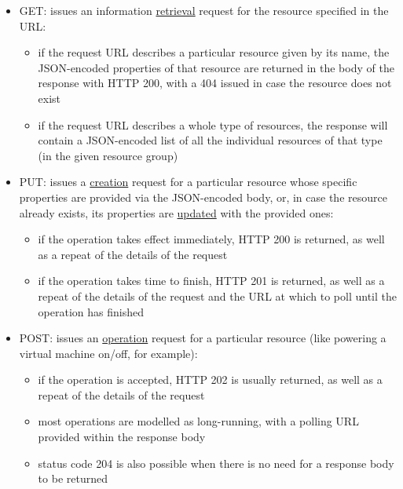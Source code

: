 \documentclass[11pt]{report}
\begin{document}
\begin{itemize}
    \item{GET}: issues an information \ul{retrieval} request for the resource
        specified in the URL:
        \begin{itemize}
            \item{} if the request URL describes a particular resource given by
                its name, the JSON-encoded properties of that resource are
                returned in the body of the response with HTTP 200, with a 404
                issued in case the resource does not exist
            \item{} if the request URL describes a whole type of resources, the
                response will contain a JSON-encoded list of all the individual
                resources of that type (in the given resource group)
        \end{itemize}
    \item{PUT}: issues a \ul{creation} request for a particular resource whose
        specific properties are provided via the JSON-encoded body, or, in case
        the resource already exists, its properties are \ul{updated} with the
        provided ones:
        \begin{itemize}
            \item{} if the operation takes effect immediately, HTTP 200 is
                returned, as well as a repeat of the details of the request
            \item{} if the operation takes time to finish, HTTP 201 is
                returned, as well as a repeat of the details of the request and
                the URL at which to poll until the operation has finished
        \end{itemize}
    \item{POST}: issues an \ul{operation} request for a particular resource
        (like powering a virtual machine on/off, for example):
        \begin{itemize}
            \item{} if the operation is accepted, HTTP 202 is usually returned,
                as well as a repeat of the details of the request
            \item{} most operations are modelled as long-running, with a polling
                URL provided within the response body
            \item{} status code 204 is also possible when there is no need for
                a response body to be returned
        \end{itemize}

\end{itemize}
\end{document}
